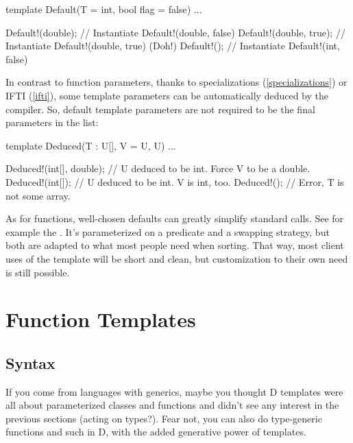 \begin{dcode}
template Default(T = int, bool flag = false)
{ ... }

Default!(double);       // Instantiate Default!(double, false)
Default!(double, true); // Instantiate Default!(double, true) (Doh!)
Default!();             // Instantiate Default!(int, false)
\end{dcode}

In contrast to function parameters, thanks to specializations (\ref{specializations}) or IFTI (\ref{ifti}), some template parameters can be automatically deduced by the compiler. So, default template parameters are not required to be the final parameters in the list:

\begin{dcode}
template Deduced(T : U[], V = U, U)
{ ... }

Deduced!(int[], double); // U deduced to be int. Force V to be a double.
Deduced!(int[]); // U deduced to be int. V is int, too.
Deduced!(); // Error, T is not some array.
\end{dcode}



As for functions, well-chosen defaults can greatly simplify standard calls. See for example the . It's parameterized on a predicate and a swapping strategy, but both are adapted to what most people need when sorting. That way, most client uses of the template will be short and clean, but customization to their own need is still possible.



\section{Function Templates}\label{functiontemplates}

\subsection{Syntax}\label{functiontemplatessyntax}

If you come from languages with generics, maybe you thought D templates were all about parameterized classes and functions and didn't see any interest in the previous sections (acting on types?). Fear not, you can also do type-generic functions and such in D, with the added generative power of templates.


